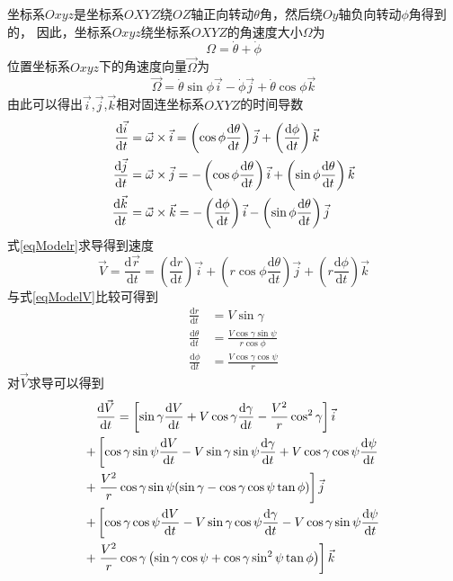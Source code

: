 坐标系$Oxyz$是坐标系$OXYZ$绕$OZ$轴正向转动$\theta$角，然后绕$Oy$轴负向转动$\phi$角得到的，
因此，坐标系$Oxyz$绕坐标系$OXYZ$的角速度大小$\Omega$为
\[\Omega = \dot{\theta} + \dot{\phi}\]
位置坐标系$Oxyz$下的角速度向量$\vec{\Omega}$为
\[\vec{\Omega} = \dot{\theta}\sin\phi\vec{i} - \dot{\phi}\vec{j} +\dot{\theta}\cos\phi\vec{k}\]
由此可以得出$\vec{i}$,$\vec{j}$,$\vec{k}$相对固连坐标系$OXYZ$的时间导数
\begin{align*}
    \frac{\text{\text{\text{\text{\text{d}}}}}\vec{i}}{\text{\text{\text{\text{\text{d}}}}}t} &=\vec{\omega} \times \vec{i}
    =  \left(\cos \phi \frac{\text{\text{\text{\text{\text{d}}}}}\theta}{\text{\text{\text{\text{\text{d}}}}}t}\right) \vec{j}
    + \left(\frac{\text{\text{\text{\text{\text{d}}}}}\phi}{\text{\text{\text{\text{\text{d}}}}}t}\right) \vec{k} \\
    \frac{\text{d}\vec{j}}{\text{d}t} &=\vec{\omega} \times \vec{j}
    = -\left(\cos \phi \frac{\text{d}\theta}{\text{d}t}\right) \vec{i}
    + \left(\sin \phi \frac{\text{d}\theta}{\text{d}t}\right) \vec{k} \\
    \frac{\text{d}\vec{k}}{\text{d}t} &=\vec{\omega} \times \vec{k}
    = -\left(\frac{\text{d}\phi}{\text{d}t}\right) \vec{i}
    - \left(\sin \phi \frac{\text{d}\theta}{\text{d}t}\right) \vec{j}
\end{align*}
式\eqref{eqModelr}求导得到速度
\[
    \vec{V}=\frac{\text{d}\vec{r}}{\text{d}t}
    =\left(\frac{\text{d}r}{\text{d}t}\right)\vec{i}
    +\left(r\cos\phi\frac{\text{d}\theta}{\text{d}t}\right)\vec{j}
    +\left(r\frac{\text{d}\phi}{\text{d}t}\right)\vec{k}
\]
与式\eqref{eqModelV}比较可得到
\begin{align*}
    \frac{\text{d}r}{\text{d}t} &=V\sin\gamma \\
    \frac{\text{d}\theta}{\text{d}t}&=\frac{V\cos\gamma\sin\psi}{r\cos\phi} \\
    \frac{\text{d}\phi}{\text{d}t}&=\frac{V\cos\gamma\cos\psi}{r}
\end{align*}
对$\vec{V}$求导可以得到
\begin{align}
    &\frac{\text{d}\vec{V}}{\text{d}t}
    = \left[\sin\gamma\frac{\text{d}V}{\text{d}t}
    + V\cos\gamma\frac{\text{d}\gamma}{\text{d}t}
    - \frac{V^{2}}{r}\cos^2\gamma\right]\vec{i} \notag\\
    +& \left[\cos\gamma\sin\psi\frac{\text{d}V}{\text{d}t}
    - V\sin\gamma\sin\psi\frac{\text{d}\gamma}{\text{d}t}
    + V\cos\gamma\cos\psi\frac{\text{d}\psi}{\text{d}t}\right. \notag\\
    +& \left.\frac{V^{2}}{r}\cos\gamma\sin\psi(\sin\gamma
    - \cos\gamma\cos\psi\tan\phi)\right]\vec{j} \notag\\
    +& \left[\cos\gamma\cos\psi\frac{\text{d}V}{\text{d}t}
    - V\sin\gamma\cos\psi\frac{\text{d}\gamma}{\text{d}t}
    - V\cos\gamma\sin\psi\frac{\text{d}\psi}{\text{d}t}\right. \notag\\
    +& \left.\frac{V^{2}}{r}\cos\gamma\left(\sin\gamma\cos\psi+\cos\gamma\sin^2\psi\tan\phi\right)\right]\vec{k} \label{eqModelTotal}
\end{align}

